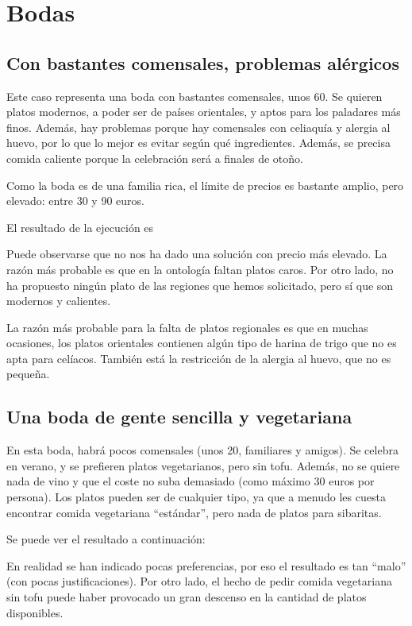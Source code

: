 % 

\section{Bodas}

\subsection{Con bastantes comensales, problemas alérgicos}
Este caso representa una boda con bastantes comensales, unos 60. Se quieren
platos modernos, a poder ser de países orientales, y aptos para los paladares
más finos. Además, hay problemas porque hay comensales con celiaquía y alergia
al huevo, por lo que lo mejor es evitar según qué ingredientes. Además, se
precisa comida caliente porque la celebración será a finales de otoño.

Como la boda es de una familia rica, el límite de precios es bastante amplio,
pero elevado: entre 30 y 90 euros.

El resultado de la ejecución es


Puede observarse que no nos ha dado una solución con precio más elevado. La
razón más probable es que en la ontología faltan platos caros. Por otro lado,
no ha propuesto ningún plato de las regiones que hemos solicitado, pero sí que
son modernos y calientes.

La razón más probable para la falta de platos regionales es que en muchas
ocasiones, los platos orientales contienen algún tipo de harina de trigo que no
es apta para celíacos. También está la restricción de la alergia al huevo, que
no es pequeña.

\subsection{Una boda de gente sencilla y vegetariana}
En esta boda, habrá pocos comensales (unos 20, familiares y amigos). Se celebra
en verano, y se prefieren platos vegetarianos, pero sin tofu. Además, no se
quiere nada de vino y que el coste no suba demasiado (como máximo 30 euros por
persona). Los platos pueden ser de cualquier tipo, ya que a menudo les cuesta
encontrar comida vegetariana ``estándar'', pero nada de platos para sibaritas.

Se puede ver el resultado a continuación:


En realidad se han indicado pocas preferencias, por eso el resultado es tan
``malo'' (con pocas justificaciones). Por otro lado, el hecho de pedir comida
vegetariana sin tofu puede haber provocado un gran descenso en la cantidad de
platos disponibles.
